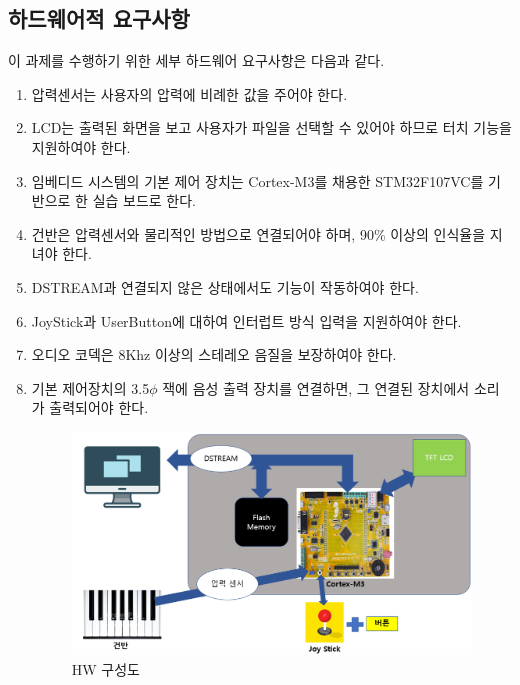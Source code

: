 \documentclass[a4paper, 11pt]{article}
\begin{document}
\subsection{하드웨어적 요구사항}
  이 과제를 수행하기 위한 세부 하드웨어 요구사항은 다음과 같다.
\begin{enumerate}
\item 압력센서는 사용자의 압력에 비례한 값을 주어야 한다. 
\item LCD는 출력된 화면을 보고 사용자가 파일을 선택할 수 있어야 하므로 터치 기능을 지원하여야 한다. 
\item 임베디드 시스템의 기본 제어 장치는 Cortex-M3를 채용한 STM32F107VC를 기반으로 한 실습 보드로 한다.
\item 건반은 압력센서와 물리적인 방법으로 연결되어야 하며, 90\% 이상의 인식율을 지녀야 한다. 
\item DSTREAM과 연결되지 않은 상태에서도 기능이 작동하여야 한다. 
\item JoyStick과 UserButton에 대하여 인터럽트 방식 입력을 지원하여야 한다.
\item 오디오 코덱은 8Khz 이상의 스테레오 음질을 보장하여야 한다. 
\item 기본 제어장치의 3.5$\phi$ 잭에 음성 출력 장치를 연결하면, 그 연결된 장치에서 소리가 출력되어야 한다.
 
\begin{figure}[h!]
\centering
\includegraphics[width=\linewidth]{./Figure/HW.png}
\caption{HW 구성도}
\label{Fig:Fig0}
\end{figure} 

\end{enumerate}
\end{document}

